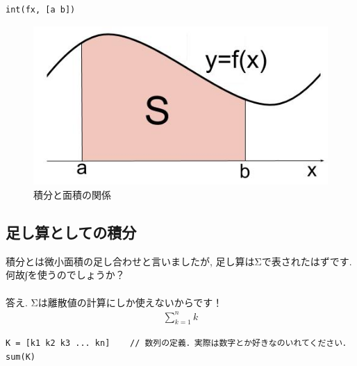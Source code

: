 \documentclass[11pt,a4paper]{jreport}
\begin{document}
\begin{lstlisting}[caption=\ref{eq:int2}のコード,label=sc:int2]
int(fx, [a b])
\end{lstlisting}


\begin{figure}[H]
\label{im:integral}
  \centering
  \includegraphics[width=120mm,bb=0 0 480 259]{../figures/int.jpg}
  \caption{積分と面積の関係}
\end{figure}


\subsection{足し算としての積分}
積分とは微小面積の足し合わせと言いましたが, 足し算はΣで表されたはずです. 何故∫を使うのでしょうか？\\
\\
答え. Σは離散値の計算にしか使えないからです！\\



\begin{eqnarray}
\label{eq:sum}
\sum_{k=1}^{n} k
\end{eqnarray}

\begin{lstlisting}[caption=\ref{eq:sum}のコード,label=sc:sum,  keepspaces=true]
K = [k1 k2 k3 ... kn]    // 数列の定義．実際は数字とか好きなのいれてください．
sum(K)
\end{lstlisting}
\end{document}
